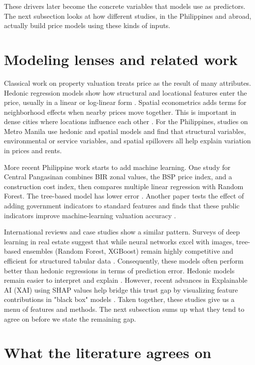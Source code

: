 These drivers later become the concrete variables that models use as predictors. The next subsection looks at how different studies, in the Philippines and abroad, actually build price models using these kinds of inputs.

\section{Modeling lenses and related work}

Classical work on property valuation treats price as the result of many attributes. Hedonic regression models show how structural and locational features enter the price, usually in a linear or log-linear form \parencite{rosen1974}. Spatial econometrics adds terms for neighborhood effects when nearby prices move together. This is important in dense cities where locations influence each other \parencite{anselin1988}. For the Philippines, studies on Metro Manila use hedonic and spatial models and find that structural variables, environmental or service variables, and spatial spillovers all help explain variation in prices and rents.

More recent Philippine work starts to add machine learning. One study for Central Pangasinan combines BIR zonal values, the BSP price index, and a construction cost index, then compares multiple linear regression with Random Forest. The tree-based model has lower error \parencite{viray2023}. Another paper tests the effect of adding government indicators to standard features and finds that these public indicators improve machine-learning valuation accuracy \parencite{ramolete2023}.

International reviews and case studies show a similar pattern. Surveys of deep learning in real estate suggest that while neural networks excel with images, tree-based ensembles (Random Forest, XGBoost) remain highly competitive and efficient for structured tabular data \parencite{wang2020}. Consequently, these models often perform better than hedonic regressions in terms of prediction error. Hedonic models remain easier to interpret and explain \parencite{breiman2001, friedman2001, chen2016}. However, recent advances in Explainable AI (XAI) using SHAP values help bridge this trust gap by visualizing feature contributions in "black box" models \parencite{hu2024}. Taken together, these studies give us a menu of features and methods. The next subsection sums up what they tend to agree on before we state the remaining gap.

\section{What the literature agrees on}

